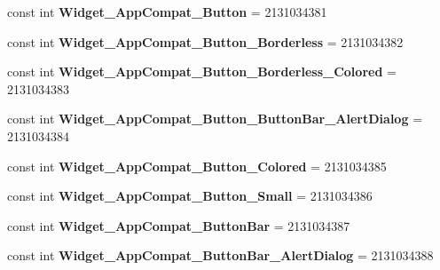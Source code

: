 \begin{DoxyCompactItemize}
\item 
\hypertarget{classClient_1_1Droid_1_1Resource_1_1Style_acfd2b9ac641383c5f969be1e1fe9721a}{}const int {\bfseries Widget\+\_\+\+App\+Compat\+\_\+\+Button} = 2131034381\label{classClient_1_1Droid_1_1Resource_1_1Style_acfd2b9ac641383c5f969be1e1fe9721a}

\item 
\hypertarget{classClient_1_1Droid_1_1Resource_1_1Style_aad0c0b235da06c1818adb9fb1793b159}{}const int {\bfseries Widget\+\_\+\+App\+Compat\+\_\+\+Button\+\_\+\+Borderless} = 2131034382\label{classClient_1_1Droid_1_1Resource_1_1Style_aad0c0b235da06c1818adb9fb1793b159}

\item 
\hypertarget{classClient_1_1Droid_1_1Resource_1_1Style_a7789919fc46d1735ead368f0904d63f1}{}const int {\bfseries Widget\+\_\+\+App\+Compat\+\_\+\+Button\+\_\+\+Borderless\+\_\+\+Colored} = 2131034383\label{classClient_1_1Droid_1_1Resource_1_1Style_a7789919fc46d1735ead368f0904d63f1}

\item 
\hypertarget{classClient_1_1Droid_1_1Resource_1_1Style_a7d71653463ca8a128f42e4827e174e99}{}const int {\bfseries Widget\+\_\+\+App\+Compat\+\_\+\+Button\+\_\+\+Button\+Bar\+\_\+\+Alert\+Dialog} = 2131034384\label{classClient_1_1Droid_1_1Resource_1_1Style_a7d71653463ca8a128f42e4827e174e99}

\item 
\hypertarget{classClient_1_1Droid_1_1Resource_1_1Style_ac8a71d7e2f338d5f45067bae5f0fbaf0}{}const int {\bfseries Widget\+\_\+\+App\+Compat\+\_\+\+Button\+\_\+\+Colored} = 2131034385\label{classClient_1_1Droid_1_1Resource_1_1Style_ac8a71d7e2f338d5f45067bae5f0fbaf0}

\item 
\hypertarget{classClient_1_1Droid_1_1Resource_1_1Style_a06cc653a86e05422c2b737da26ecf7aa}{}const int {\bfseries Widget\+\_\+\+App\+Compat\+\_\+\+Button\+\_\+\+Small} = 2131034386\label{classClient_1_1Droid_1_1Resource_1_1Style_a06cc653a86e05422c2b737da26ecf7aa}

\item 
\hypertarget{classClient_1_1Droid_1_1Resource_1_1Style_a2ae5adf389c2966164568a96bc145707}{}const int {\bfseries Widget\+\_\+\+App\+Compat\+\_\+\+Button\+Bar} = 2131034387\label{classClient_1_1Droid_1_1Resource_1_1Style_a2ae5adf389c2966164568a96bc145707}

\item 
\hypertarget{classClient_1_1Droid_1_1Resource_1_1Style_ab0c3d701a99dbac457830f53b5999831}{}const int {\bfseries Widget\+\_\+\+App\+Compat\+\_\+\+Button\+Bar\+\_\+\+Alert\+Dialog} = 2131034388\label{classClient_1_1Droid_1_1Resource_1_1Style_ab0c3d701a99dbac457830f53b5999831}


\end{DoxyCompactItemize}
